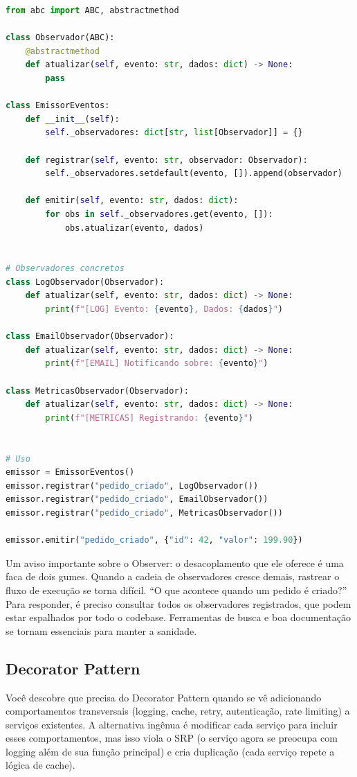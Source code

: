 \begin{lstlisting}[language=Python, caption={Observer Pattern em Python}]
from abc import ABC, abstractmethod

class Observador(ABC):
    @abstractmethod
    def atualizar(self, evento: str, dados: dict) -> None:
        pass

class EmissorEventos:
    def __init__(self):
        self._observadores: dict[str, list[Observador]] = {}

    def registrar(self, evento: str, observador: Observador):
        self._observadores.setdefault(evento, []).append(observador)

    def emitir(self, evento: str, dados: dict):
        for obs in self._observadores.get(evento, []):
            obs.atualizar(evento, dados)


# Observadores concretos
class LogObservador(Observador):
    def atualizar(self, evento: str, dados: dict) -> None:
        print(f"[LOG] Evento: {evento}, Dados: {dados}")

class EmailObservador(Observador):
    def atualizar(self, evento: str, dados: dict) -> None:
        print(f"[EMAIL] Notificando sobre: {evento}")

class MetricasObservador(Observador):
    def atualizar(self, evento: str, dados: dict) -> None:
        print(f"[METRICAS] Registrando: {evento}")


# Uso
emissor = EmissorEventos()
emissor.registrar("pedido_criado", LogObservador())
emissor.registrar("pedido_criado", EmailObservador())
emissor.registrar("pedido_criado", MetricasObservador())

emissor.emitir("pedido_criado", {"id": 42, "valor": 199.90})
\end{lstlisting}

Um aviso importante sobre o Observer: o desacoplamento que ele oferece é uma
faca de dois gumes. Quando a cadeia de observadores cresce demais, rastrear o
fluxo de execução se torna difícil. ``O que acontece quando um pedido é
criado?'' Para responder, é preciso consultar todos os observadores registrados,
que podem estar espalhados por todo o codebase. Ferramentas de busca e boa
documentação se tornam essenciais para manter a sanidade.

\subsection{Decorator Pattern}

Você descobre que precisa do Decorator Pattern quando se vê adicionando
comportamentos transversais (logging, cache, retry, autenticação,
rate limiting) a serviços existentes. A alternativa ingênua é modificar
cada serviço para incluir esses comportamentos, mas isso viola o SRP (o
serviço agora se preocupa com logging além de sua função principal) e cria
duplicação (cada serviço repete a lógica de cache).

